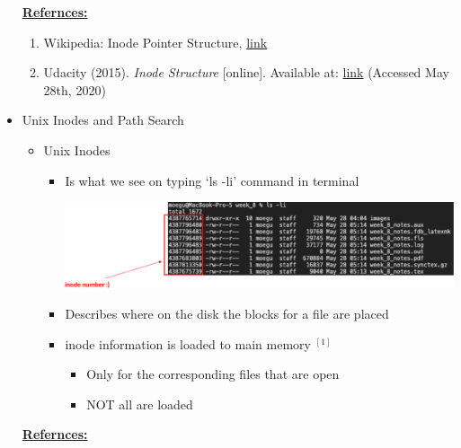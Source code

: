 \documentclass[12pt]{article}
\begin{document}
\begin{itemize}
    \underline{\textbf{Refernces:}}

    \bigskip

    \begin{enumerate}[1)]
        \item Wikipedia: Inode Pointer Structure, \href{https://en.wikipedia.org/wiki/Inode_pointer_structure}{link}
        \item Udacity (2015). \textit{Inode Structure} [online]. Available at: \href{https://www.youtube.com/watch?v=tMVj22EWg6A}{link} (Accessed May 28th, 2020)
    \end{enumerate}
    \item Unix Inodes and Path Search
    \begin{itemize}
        \item Unix Inodes
        \begin{itemize}
            \item Is what we see on typing `ls -li' command in terminal

            \begin{center}
            \includegraphics[width=\linewidth]{images/week_8_notes_1_9.png}
            \end{center}
            \item Describes where on the disk the blocks for a file are placed
            \item inode information is loaded to main memory $^{[1]}$
            \begin{itemize}
                \item Only for the corresponding files that are open
                \item NOT all are loaded
            \end{itemize}
        \end{itemize}
    \end{itemize}

    \bigskip

    \underline{\textbf{Refernces:}}

    \bigskip


\end{itemize}
\end{document}
